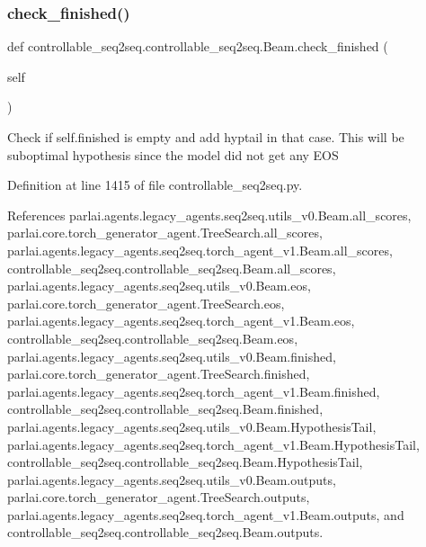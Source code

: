 \subsubsection{\texorpdfstring{check\+\_\+finished()}{check\_finished()}}
{\footnotesize\ttfamily def controllable\+\_\+seq2seq.\+controllable\+\_\+seq2seq.\+Beam.\+check\+\_\+finished (\begin{DoxyParamCaption}\item[{}]{self }\end{DoxyParamCaption})}

\begin{DoxyVerb}Check if self.finished is empty and add hyptail in that case.
This will be suboptimal hypothesis since the model did not get any EOS
\end{DoxyVerb}
 

Definition at line 1415 of file controllable\+\_\+seq2seq.\+py.



References parlai.\+agents.\+legacy\+\_\+agents.\+seq2seq.\+utils\+\_\+v0.\+Beam.\+all\+\_\+scores, parlai.\+core.\+torch\+\_\+generator\+\_\+agent.\+Tree\+Search.\+all\+\_\+scores, parlai.\+agents.\+legacy\+\_\+agents.\+seq2seq.\+torch\+\_\+agent\+\_\+v1.\+Beam.\+all\+\_\+scores, controllable\+\_\+seq2seq.\+controllable\+\_\+seq2seq.\+Beam.\+all\+\_\+scores, parlai.\+agents.\+legacy\+\_\+agents.\+seq2seq.\+utils\+\_\+v0.\+Beam.\+eos, parlai.\+core.\+torch\+\_\+generator\+\_\+agent.\+Tree\+Search.\+eos, parlai.\+agents.\+legacy\+\_\+agents.\+seq2seq.\+torch\+\_\+agent\+\_\+v1.\+Beam.\+eos, controllable\+\_\+seq2seq.\+controllable\+\_\+seq2seq.\+Beam.\+eos, parlai.\+agents.\+legacy\+\_\+agents.\+seq2seq.\+utils\+\_\+v0.\+Beam.\+finished, parlai.\+core.\+torch\+\_\+generator\+\_\+agent.\+Tree\+Search.\+finished, parlai.\+agents.\+legacy\+\_\+agents.\+seq2seq.\+torch\+\_\+agent\+\_\+v1.\+Beam.\+finished, controllable\+\_\+seq2seq.\+controllable\+\_\+seq2seq.\+Beam.\+finished, parlai.\+agents.\+legacy\+\_\+agents.\+seq2seq.\+utils\+\_\+v0.\+Beam.\+Hypothesis\+Tail, parlai.\+agents.\+legacy\+\_\+agents.\+seq2seq.\+torch\+\_\+agent\+\_\+v1.\+Beam.\+Hypothesis\+Tail, controllable\+\_\+seq2seq.\+controllable\+\_\+seq2seq.\+Beam.\+Hypothesis\+Tail, parlai.\+agents.\+legacy\+\_\+agents.\+seq2seq.\+utils\+\_\+v0.\+Beam.\+outputs, parlai.\+core.\+torch\+\_\+generator\+\_\+agent.\+Tree\+Search.\+outputs, parlai.\+agents.\+legacy\+\_\+agents.\+seq2seq.\+torch\+\_\+agent\+\_\+v1.\+Beam.\+outputs, and controllable\+\_\+seq2seq.\+controllable\+\_\+seq2seq.\+Beam.\+outputs.

